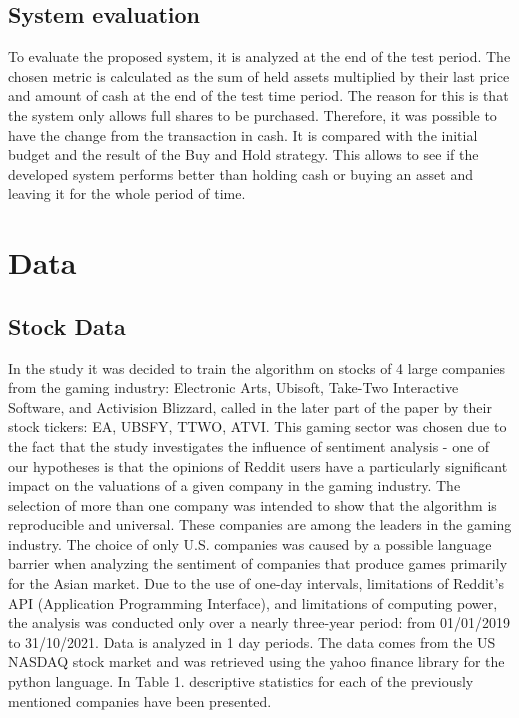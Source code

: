 \documentclass[11pt]{article} %
\begin{document}
\subsection{System evaluation}
To evaluate the proposed system, it is analyzed at the end of the test period. The chosen metric is calculated as the sum of held assets multiplied by their last price and amount of cash at the end of the test time period. The reason for this is that the system only allows full shares to be purchased. Therefore, it was possible to have the change from the transaction in cash. It is compared with the initial budget and the result of the Buy and Hold strategy. This allows to see if the developed system performs better than holding cash or buying an asset and leaving it for the whole period of time. 

\section{Data}
\subsection{Stock Data}
In the study it was decided to train the algorithm on stocks of 4 large companies from the gaming industry: Electronic Arts, Ubisoft, Take-Two Interactive Software, and Activision Blizzard, called in the later part of the paper by their stock tickers: EA, UBSFY, TTWO, ATVI. This gaming sector was chosen due to the fact that the study investigates the influence of sentiment analysis - one of our hypotheses is that the opinions of Reddit users have a particularly significant impact on the valuations of a given company in the gaming industry.  The selection of more than one company was intended to show that the algorithm is reproducible and universal. These companies are among the leaders in the gaming industry. The choice of only U.S. companies was caused by a possible language barrier when analyzing the sentiment of companies that produce games primarily for the Asian market. Due to the use of one-day intervals, limitations of Reddit's API (Application Programming Interface), and limitations of computing power, the analysis was conducted only over a nearly three-year period: from 01/01/2019 to 31/10/2021. Data is analyzed in 1 day periods. The data comes from the US NASDAQ stock market and was retrieved using the yahoo finance library for the python language. In Table 1. descriptive statistics for each of the previously mentioned companies have been presented. 
\end{document}
